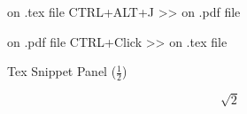 \documentclass{article}
\begin{document}
on .tex file CTRL+ALT+J >> on .pdf file

on .pdf file CTRL+Click >> on .tex file

Tex Snippet Panel ($\frac{1}{2} $)

$$\sqrt{2} $$
\end{document}

